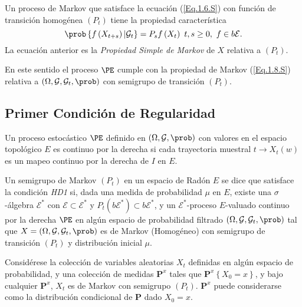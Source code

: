 Un proceso de Markov que satisface la ecuaci\'on (\ref{Eq.1.6.S}) con funci\'on de transici\'on homog\'enea $\left(P_{t}\right)$ tiene la propiedad caracter\'istica
\begin{equation}\label{Eq.1.8.S}
\prob\left\{f\left(X_{t+s}\right)|\mathcal{G}_{t}\right\}=P_{s}f\left(X_{t}\right)\textrm{ }t,s\geq0,\textrm{ }f\in b\mathcal{E}.
\end{equation}
La ecuaci\'on anterior es la {\em Propiedad Simple de Markov} de $X$ relativa a $\left(P_{t}\right)$.

En este sentido el proceso $\PE$ cumple con la propiedad de Markov (\ref{Eq.1.8.S}) relativa a $\left(\Omega,\mathcal{G},\mathcal{G}_{t},\prob\right)$ con semigrupo de transici\'on $\left(P_{t}\right)$.
\subsection{Primer Condici\'on de Regularidad}
\begin{Def}
Un proceso estoc\'astico $\PE$ definido en
$\left(\Omega,\mathcal{G},\prob\right)$ con valores en el espacio
topol\'ogico $E$ es continuo por la derecha si cada trayectoria
muestral $t\rightarrow X_{t}\left(w\right)$ es un mapeo continuo
por la derecha de $I$ en $E$.
\end{Def}

\begin{Def}[HD1]\label{Eq.2.1.S}
Un semigrupo de Markov $\left(P_{t}\right)$ en un espacio de
Rad\'on $E$ se dice que satisface la condici\'on {\em HD1} si,
dada una medida de probabilidad $\mu$ en $E$, existe una
$\sigma$-\'algebra $\mathcal{E^{*}}$ con
$\mathcal{E}\subset\mathcal{E}^{*}$ y
$P_{t}\left(b\mathcal{E}^{*}\right)\subset b\mathcal{E}^{*}$, y un
$\mathcal{E}^{*}$-proceso $E$-valuado continuo por la derecha
$\PE$ en alg\'un espacio de probabilidad filtrado
$\left(\Omega,\mathcal{G},\mathcal{G}_{t},\prob\right)$ tal que
$X=\left(\Omega,\mathcal{G},\mathcal{G}_{t},\prob\right)$ es de
Markov (Homog\'eneo) con semigrupo de transici\'on $(P_{t})$ y
distribuci\'on inicial $\mu$.
\end{Def}

Consid\'erese la colecci\'on de variables aleatorias $X_{t}$
definidas en alg\'un espacio de probabilidad, y una colecci\'on de
medidas $\mathbf{P}^{x}$ tales que
$\mathbf{P}^{x}\left\{X_{0}=x\right\}$, y bajo cualquier
$\mathbf{P}^{x}$, $X_{t}$ es de Markov con semigrupo
$\left(P_{t}\right)$. $\mathbf{P}^{x}$ puede considerarse como la
distribuci\'on condicional de $\mathbf{P}$ dado $X_{0}=x$.

